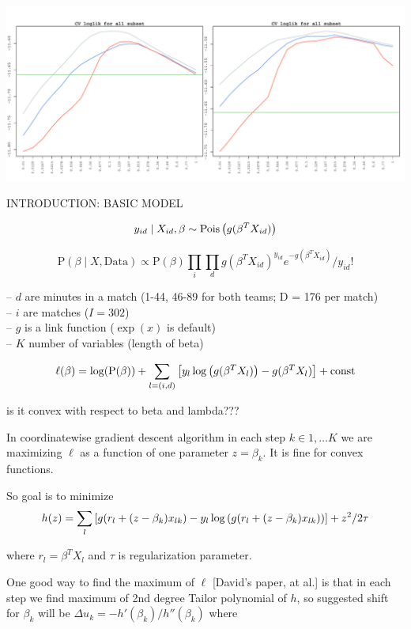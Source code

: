 \documentclass[12pt, letter]{article}
\begin{document}
\includegraphics[width=6.5in]{MULT.pdf}


\newpage

{\LARGE INTRODUCTION: BASIC MODEL}

$$y_{id}\mid X_{id}, \beta \sim \mathrm{Pois}\zag{g(\beta^T X_{id})}$$

$$\mathrm{P}(\beta\mid X, \mathrm{Data}) \propto \mathrm{P}(\beta) \prod_i \prod_d
    g(\beta^T X_{id})^{y_{id}} e^{-g(\beta^T X_{id})}/y_{id}!$$

   -- $d$ are minutes in a match (1-44, 46-89 for both teams; D = 176 per match)\\
   -- $i$ are matches ($I=302$)\\
   -- $g$ is a link function ($\exp(x)$ is default)\\
   -- $K$ number of variables (length of beta)

$$\ell(\beta) = \log(\mathrm{P(\beta)}) + \sum_{l=(i,d)} \zags{y_l\log\zag{g(\beta^T X_l)} - g(\beta^T X_l)} + \mathrm{const}$$

is it convex with respect to beta and lambda???

In coordinatewise gradient descent algorithm in each step $k \in 1,\dots K$ we are maximizing $\ell$ as a function of one parameter $z=\beta_k$. It is fine for convex functions.

So goal is to minimize
$$h(z) = \sum_l \zags{g(r_l + (z-\beta_k)x_{lk}) - y_l\log\zag{g(r_l + (z-\beta_k)x_{lk})}} + z^2/2\tau$$

where $r_l = \beta^T X_l$ and $\tau$ is regularization parameter.

One good way to find the maximum of $\ell$ [David's paper, at al.] is that in each step we find maximum of 2nd degree Tailor polynomial of $h$, so suggested shift for $\beta_k$ will be $\Delta u_k = -h'(\beta_k)/h''(\beta_k)$ where
\end{document}
